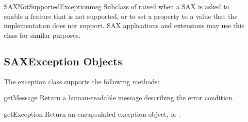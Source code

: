 \begin{excclassdesc}{SAXNotSupportedException}{msg}
  Subclass of  raised when a SAX
   is asked to enable a feature that is not
  supported, or to set a property to a value that the implementation
  does not support.  SAX applications and extensions may use this
  class for similar purposes.
\end{excclassdesc}


\begin{seealso}



\end{seealso}


\subsection{SAXException Objects \label{sax-exception-objects}}

The  exception class supports the following
methods:

\begin{methoddesc}[SAXException]{getMessage}{}
  Return a human-readable message describing the error condition.
\end{methoddesc}

\begin{methoddesc}[SAXException]{getException}{}
  Return an encapsulated exception object, or .
\end{methoddesc}
